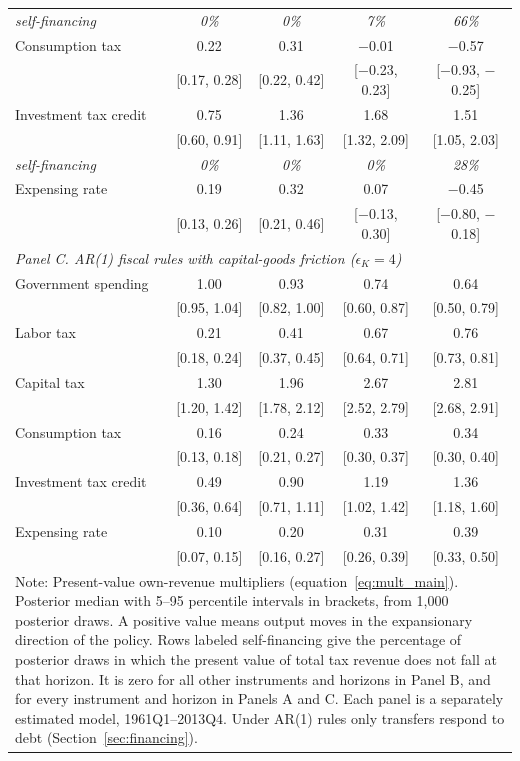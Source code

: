 \begin{table}[ht]
\begin{tabular}{lcccc}
\quad\textit{self-financing} & \textit{0\%} & \textit{0\%} & \textit{7\%} & \textit{66\%} \\
Consumption tax          & 0.22 & 0.31 & $-$0.01 & $-$0.57 \\
                         & [0.17, 0.28] & [0.22, 0.42] & [$-$0.23, 0.23] & [$-$0.93, $-$0.25] \\
Investment tax credit    & 0.75 & 1.36 & 1.68 & 1.51 \\
                         & [0.60, 0.91] & [1.11, 1.63] & [1.32, 2.09] & [1.05, 2.03] \\
\quad\textit{self-financing} & \textit{0\%} & \textit{0\%} & \textit{0\%} & \textit{28\%} \\
Expensing rate           & 0.19 & 0.32 & 0.07 & $-$0.45 \\
                         & [0.13, 0.26] & [0.21, 0.46] & [$-$0.13, 0.30] & [$-$0.80, $-$0.18] \\
\hline
\multicolumn{5}{l}{\textit{Panel C. AR(1) fiscal rules with capital-goods friction ($\epsilon_K = 4$)}} \\
Government spending      & 1.00 & 0.93 & 0.74 & 0.64 \\
                         & [0.95, 1.04] & [0.82, 1.00] & [0.60, 0.87] & [0.50, 0.79] \\
Labor tax                & 0.21 & 0.41 & 0.67 & 0.76 \\
                         & [0.18, 0.24] & [0.37, 0.45] & [0.64, 0.71] & [0.73, 0.81] \\
Capital tax              & 1.30 & 1.96 & 2.67 & 2.81 \\
                         & [1.20, 1.42] & [1.78, 2.12] & [2.52, 2.79] & [2.68, 2.91] \\
Consumption tax          & 0.16 & 0.24 & 0.33 & 0.34 \\
                         & [0.13, 0.18] & [0.21, 0.27] & [0.30, 0.37] & [0.30, 0.40] \\
Investment tax credit    & 0.49 & 0.90 & 1.19 & 1.36 \\
                         & [0.36, 0.64] & [0.71, 1.11] & [1.02, 1.42] & [1.18, 1.60] \\
Expensing rate           & 0.10 & 0.20 & 0.31 & 0.39 \\
                         & [0.07, 0.15] & [0.16, 0.27] & [0.26, 0.39] & [0.33, 0.50] \\
\hline\hline
\multicolumn{5}{p{0.85\textwidth}}{\footnotesize Note: Present-value own-revenue multipliers (equation~\ref{eq:mult_main}). Posterior median with 5--95 percentile intervals in brackets, from 1{,}000 posterior draws. A positive value means output moves in the expansionary direction of the policy. Rows labeled self-financing give the percentage of posterior draws in which the present value of total tax revenue does not fall at that horizon. It is zero for all other instruments and horizons in Panel B, and for every instrument and horizon in Panels A and C. Each panel is a separately estimated model, 1961Q1--2013Q4. Under AR(1) rules only transfers respond to debt (Section~\ref{sec:financing}).}
\end{tabular}
\end{table}
